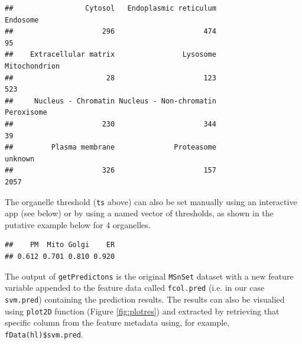 \begin{knitrout}
\begin{kframe}
\begin{verbatim}
##                 Cytosol   Endoplasmic reticulum                Endosome 
##                     296                     474                      95 
##    Extracellular matrix                Lysosome           Mitochondrion 
##                      28                     123                     523 
##     Nucleus - Chromatin Nucleus - Non-chromatin              Peroxisome 
##                     230                     344                      39 
##         Plasma membrane              Proteasome                 unknown 
##                     326                     157                    2057
\end{verbatim}
\end{kframe}
\end{knitrout}

The organelle threshold (\texttt{ts} above) can also be set manually
using an interactive app (see below) or by using a named vector of
thresholds, as shown in the putative example below for 4 organelles.

\begin{knitrout}
\color{fgcolor}\begin{kframe}
\begin{alltt}
 \hlkwb{<-} \hlstd{(}\hlstd{(}\hlstd{,} \hlstd{,} \hlstd{,} \hlstd{),} \hlstd{(}\hlstd{,} \hlstd{,} \hlstd{,} \hlstd{)))}
\end{alltt}
\begin{verbatim}
##    PM  Mito Golgi    ER 
## 0.612 0.701 0.810 0.920
\end{verbatim}
\end{kframe}
\end{knitrout}

The output of \texttt{getPredictons} is the original \texttt{MSnSet}
dataset with a new feature variable appended to the feature data
called \texttt{fcol.pred} (i.e. in our case \texttt{svm.pred})
containing the prediction results. The results can also be visualied
using \texttt{plot2D} function (Figure \ref{fig:plotres}) and
extracted by retrieving that specific column from the feature metadata
using, for example, \texttt{fData(hl)\$svm.pred}.



